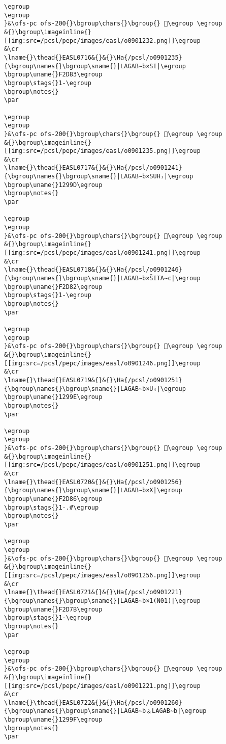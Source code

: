 \begin{verbatim}
\egroup
\egroup
}&\ofs-pc ofs-200{}\bgroup\chars{}\bgroup{} 𒦜\egroup \egroup
&{}\bgroup\imageinline{}[[img:src=/pcsl/pepc/images/easl/o0901232.png]]\egroup
&\cr
\lname{}\thead{}EASL0716&{}&{}\Ha{/pcsl/o0901235}{\bgroup\names{}\bgroup\sname{}|LAGAB∼b×SI|\egroup
\bgroup\uname{}F2D83\egroup
\bgroup\stags{}1-\egroup
\bgroup\notes{}
\par 

\egroup
\egroup
}&\ofs-pc ofs-200{}\bgroup\chars{}\bgroup{} 󲶃\egroup \egroup
&{}\bgroup\imageinline{}[[img:src=/pcsl/pepc/images/easl/o0901235.png]]\egroup
&\cr
\lname{}\thead{}EASL0717&{}&{}\Ha{/pcsl/o0901241}{\bgroup\names{}\bgroup\sname{}|LAGAB∼b×SUH₃|\egroup
\bgroup\uname{}1299D\egroup
\bgroup\notes{}
\par 

\egroup
\egroup
}&\ofs-pc ofs-200{}\bgroup\chars{}\bgroup{} 𒦝\egroup \egroup
&{}\bgroup\imageinline{}[[img:src=/pcsl/pepc/images/easl/o0901241.png]]\egroup
&\cr
\lname{}\thead{}EASL0718&{}&{}\Ha{/pcsl/o0901246}{\bgroup\names{}\bgroup\sname{}|LAGAB∼b×ŠITA∼c|\egroup
\bgroup\uname{}F2D82\egroup
\bgroup\stags{}1-\egroup
\bgroup\notes{}
\par 

\egroup
\egroup
}&\ofs-pc ofs-200{}\bgroup\chars{}\bgroup{} 󲶂\egroup \egroup
&{}\bgroup\imageinline{}[[img:src=/pcsl/pepc/images/easl/o0901246.png]]\egroup
&\cr
\lname{}\thead{}EASL0719&{}&{}\Ha{/pcsl/o0901251}{\bgroup\names{}\bgroup\sname{}|LAGAB∼b×U₄|\egroup
\bgroup\uname{}1299E\egroup
\bgroup\notes{}
\par 

\egroup
\egroup
}&\ofs-pc ofs-200{}\bgroup\chars{}\bgroup{} 𒦞\egroup \egroup
&{}\bgroup\imageinline{}[[img:src=/pcsl/pepc/images/easl/o0901251.png]]\egroup
&\cr
\lname{}\thead{}EASL0720&{}&{}\Ha{/pcsl/o0901256}{\bgroup\names{}\bgroup\sname{}|LAGAB∼b×X|\egroup
\bgroup\uname{}F2D86\egroup
\bgroup\stags{}1-.#\egroup
\bgroup\notes{}
\par 

\egroup
\egroup
}&\ofs-pc ofs-200{}\bgroup\chars{}\bgroup{} 󲶆\egroup \egroup
&{}\bgroup\imageinline{}[[img:src=/pcsl/pepc/images/easl/o0901256.png]]\egroup
&\cr
\lname{}\thead{}EASL0721&{}&{}\Ha{/pcsl/o0901221}{\bgroup\names{}\bgroup\sname{}|LAGAB∼b×1(N01)|\egroup
\bgroup\uname{}F2D7B\egroup
\bgroup\stags{}1-\egroup
\bgroup\notes{}
\par 

\egroup
\egroup
}&\ofs-pc ofs-200{}\bgroup\chars{}\bgroup{} 󲵻\egroup \egroup
&{}\bgroup\imageinline{}[[img:src=/pcsl/pepc/images/easl/o0901221.png]]\egroup
&\cr
\lname{}\thead{}EASL0722&{}&{}\Ha{/pcsl/o0901260}{\bgroup\names{}\bgroup\sname{}|LAGAB∼b﹠LAGAB∼b|\egroup
\bgroup\uname{}1299F\egroup
\bgroup\notes{}
\par 


\end{verbatim}

